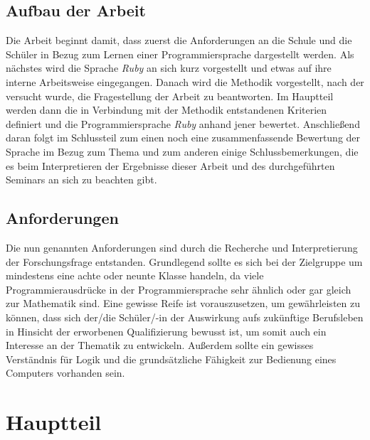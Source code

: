 \documentclass[12pt,DIV=14, version=first, BCOR=10mm,a4paper,twoside,parskip=half-,headsepline,headinclude]{scrartcl}
\begin{document}
\subsection{Aufbau der Arbeit}
\begin{flushleft}
Die Arbeit beginnt damit, dass zuerst die Anforderungen an die Schule und die Schüler in Bezug zum Lernen einer Programmiersprache dargestellt werden. Als nächstes wird die Sprache \textit{\glqq Ruby\grqq} an sich kurz vorgestellt und etwas auf ihre interne Arbeitsweise eingegangen. Danach wird die Methodik vorgestellt, nach der versucht wurde, die Fragestellung der Arbeit zu beantworten. Im Hauptteil werden dann die in Verbindung mit der Methodik entstandenen Kriterien definiert und die Programmiersprache \textit{\glqq Ruby\grqq} anhand jener bewertet. Anschließend daran folgt im Schlussteil zum einen noch eine zusammenfassende Bewertung der Sprache im Bezug zum Thema und zum anderen einige Schlussbemerkungen, die es beim Interpretieren der Ergebnisse dieser Arbeit und des durchgeführten Seminars an sich zu beachten gibt.
\end{flushleft}

\subsection{Anforderungen}
\begin{flushleft}
Die nun genannten Anforderungen sind durch die Recherche und Interpretierung  der Forschungsfrage entstanden. Grundlegend sollte es sich bei der Zielgruppe um mindestens eine achte oder neunte Klasse handeln, da viele Programmierausdrücke in der Programmiersprache sehr ähnlich oder gar gleich zur Mathematik sind. Eine gewisse Reife ist vorauszusetzen, um gewährleisten zu können, dass sich der/die Schüler/-in der Auswirkung aufs zukünftige Berufsleben in Hinsicht der erworbenen Qualifizierung bewusst ist, um somit auch ein Interesse an der Thematik zu entwickeln. Außerdem sollte ein gewisses Verständnis für Logik und die grundsätzliche Fähigkeit zur Bedienung eines Computers vorhanden sein.
\end{flushleft}

\section{Hauptteil}
\end{document}
